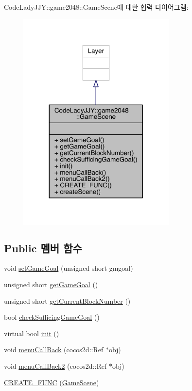 Code\+Lady\+J\+JY\+:\+:game2048\+:\+:Game\+Scene에 대한 협력 다이어그램\+:
\nopagebreak
\begin{figure}[H]
\begin{center}
\leavevmode
\includegraphics[width=224pt]{class_code_lady_j_j_y_1_1game2048_1_1_game_scene__coll__graph}
\end{center}
\end{figure}
\subsection*{Public 멤버 함수}
\begin{DoxyCompactItemize}
\item 
void \hyperlink{class_code_lady_j_j_y_1_1game2048_1_1_game_scene_ae674d90ff1c81818e308c99da876fbe8}{set\+Game\+Goal} (unsigned short gmgoal)
\item 
unsigned short \hyperlink{class_code_lady_j_j_y_1_1game2048_1_1_game_scene_a91a4b92af4105f3a0e60b58b96ec0cb5}{get\+Game\+Goal} ()
\item 
unsigned short \hyperlink{class_code_lady_j_j_y_1_1game2048_1_1_game_scene_a102fddfdf3e911218583dbc375786402}{get\+Current\+Block\+Number} ()
\item 
bool \hyperlink{class_code_lady_j_j_y_1_1game2048_1_1_game_scene_a9e9ea53a4ff493d0aafc2197c3bae12c}{check\+Sufficing\+Game\+Goal} ()
\item 
virtual bool \hyperlink{class_code_lady_j_j_y_1_1game2048_1_1_game_scene_ab0ccbc102ba9ceca94daddc2e8f253ba}{init} ()
\item 
void \hyperlink{class_code_lady_j_j_y_1_1game2048_1_1_game_scene_ac748b7487b72bc4722b7bbdb181e7267}{menu\+Call\+Back} (cocos2d\+::\+Ref $\ast$obj)
\item 
void \hyperlink{class_code_lady_j_j_y_1_1game2048_1_1_game_scene_a5fb8ef01d49e87cd898f4d9646dd3034}{menu\+Call\+Back2} (cocos2d\+::\+Ref $\ast$obj)
\item 
\hyperlink{class_code_lady_j_j_y_1_1game2048_1_1_game_scene_ae4a2a6b84c48c11a1be2339b59720b5e}{C\+R\+E\+A\+T\+E\+\_\+\+F\+U\+NC} (\hyperlink{class_code_lady_j_j_y_1_1game2048_1_1_game_scene}{Game\+Scene})
\end{DoxyCompactItemize}
